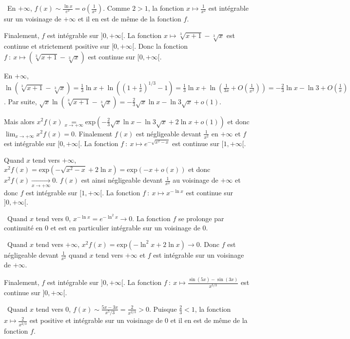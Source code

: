 {{\textbullet~En $+\infty$,  $f(x)\sim\frac{\ln x}{e^x}=o\left(\frac{1}{x^2}\right)$. Comme $2>1$, la fonction $x\mapsto\frac{1}{x^2}$ est intégrable sur un voisinage de $+\infty$ et il en est de même de la fonction $f$. 

Finalement, $f$ est intégrable sur $]0,+\infty[$.
La fonction $x\mapsto\sqrt[3]{x+1}-\sqrt[3]{x}$ est continue et strictement positive sur $[0,+\infty[$. Donc la fonction $f~:~x\mapsto\left(\sqrt[3]{x+1}-\sqrt[3]{x}\right)$ est continue sur $[0,+\infty[$.

En $+\infty$, $\ln\left(\sqrt[3]{x+1}-\sqrt[3]{x}\right)=\frac{1}{3}\ln x+\ln\left(\left(1+\frac{1}{x}\right)^{1/3}-1\right)=\frac{1}{3}\ln x+\ln\left(\frac{1}{3x}+O\left(\frac{1}{x^2}\right)\right)= -\frac{2}{3}\ln x -\ln3 + O\left(\frac{1}{x}\right)$. Par suite, $\sqrt{x}\ln\left(\sqrt[3]{x+1}-\sqrt[3]{x}\right)=-\frac{2}{3}\sqrt{x}\ln x -\ln3\sqrt{x}+o(1)$.

Mais alors $x^2f(x)\underset{x\rightarrow+\infty}{=}\text{exp}\left(-\frac{2}{3}\sqrt{x}\ln x -\ln3\sqrt{x}+2\ln x+o(1)\right)$ et donc $\lim_{x \rightarrow +\infty}x^2f(x)=0$. Finalement $f(x)$ est négligeable devant $\frac{1}{x^2}$ en $+\infty$ et $f$ est intégrable sur $[0,+\infty[$.
La fonction $f~:~x\mapsto e^{-\sqrt{x^2-x}}$ est continue sur $[1,+\infty[$.

Quand $x$ tend vers $+\infty$, $x^2f(x)=\text{exp}\left(-\sqrt{x^2-x}+2\ln x\right)=\text{exp}(-x+o(x))$ et donc $x^2f(x)\underset{x\rightarrow+\infty}{\rightarrow}0$. $f(x)$ est ainsi négligeable devant $\frac{1}{x^2}$ au voisinage de $+\infty$ et donc $f$ est intégrable sur $[1,+\infty[$.
La fonction $f~:~x\mapsto x^{-\ln x}$ est continue sur $]0,+\infty[$.

\textbullet~Quand $x$ tend vers $0$, $x^{-\ln x}=e^{-\ln^2x}\rightarrow0$. La fonction $f$ se prolonge par continuité en $0$ et est en particulier intégrable sur un voisinage de $0$.

\textbullet~Quand $x$ tend vers $+\infty$, $x^2f(x)=\text{exp}\left(-\ln^2x+2\ln x\right)\rightarrow0$. Donc $f$ est négligeable devant  $\frac{1}{x^2}$ quand $x$ tend vers $+\infty$ et $f$ est intégrable sur un voisinage de $+\infty$.

Finalement, $f$ est intégrable sur $]0,+\infty[$.
La fonction $f~:~x\mapsto\frac{\sin(5x)-\sin(3x)}{x^{5/3}}$  est continue sur $]0,+\infty[$.

\textbullet~Quand $x$ tend vers $0$,  $f(x)\sim\frac{5x-3x}{x^5/3}=\frac{2}{x^{2/3}}>0$. Puisque $\frac{2}{3}<1$, la fonction $x\mapsto\frac{2}{x^{2/3}}$ est positive et intégrable sur un voisinage de $0$ et il en est de même de la fonction $f$.

}}

